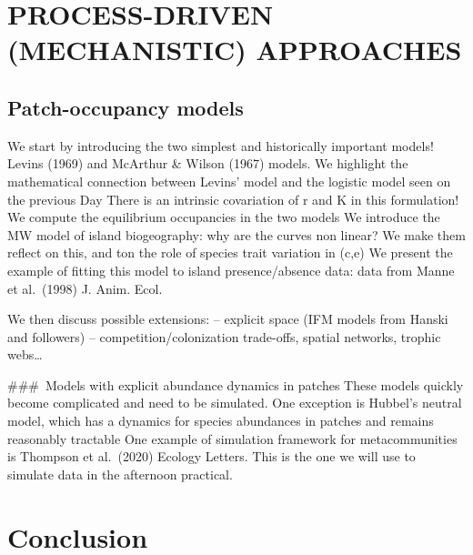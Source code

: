 \documentclass[
]{book}
\theoremstyle{definition}
\theoremstyle{definition}
\theoremstyle{definition}
\theoremstyle{definition}
\theoremstyle{remark}
\begin{document}
\section{PROCESS-DRIVEN (MECHANISTIC) APPROACHES}\label{process-driven-mechanistic-approaches}

\subsection{Patch-occupancy models}\label{patch-occupancy-models}

We start by introducing the two simplest and historically important models! Levins (1969) and McArthur \& Wilson (1967) models.
We highlight the mathematical connection between Levins' model and the logistic model seen on the previous Day
There is an intrinsic covariation of r and K in this formulation!
We compute the equilibrium occupancies in the two models
We introduce the MW model of island biogeography: why are the curves non linear? We make them reflect on this, and ton the role of species trait variation in (c,e)
We present the example of fitting this model to island presence/absence data: data from Manne et al.~(1998) J. Anim. Ecol.

We then discuss possible extensions:
-- explicit space (IFM models from Hanski and followers)
-- competition/colonization trade-offs, spatial networks, trophic webs\ldots{}

\#\#\#~Models with explicit abundance dynamics in patches
These models quickly become complicated and need to be simulated.
One exception is Hubbel's neutral model, which has a dynamics for species abundances in patches and remains reasonably tractable
One example of simulation framework for metacommunities is Thompson et al.~(2020) Ecology Letters. This is the one we will use to simulate data in the afternoon practical.

\section{Conclusion}\label{conclusion}

  
\end{document}

